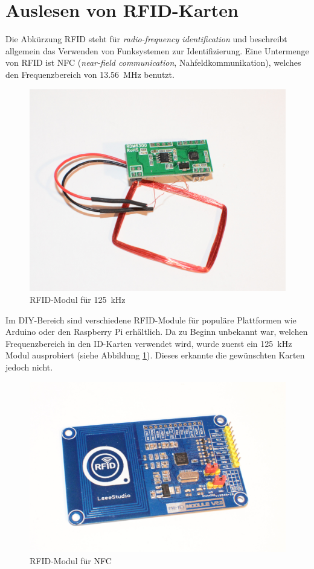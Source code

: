 \documentclass[11pt,a4paper]{IEEEtran}
\begin{document}
\section{Auslesen von RFID-Karten} \label{sec:rfid}

Die Abkürzung RFID steht für \emph{radio-frequency identification} und
beschreibt allgemein das Verwenden von Funksystemen zur Identifizierung. Eine
Untermenge von RFID ist NFC (\emph{near-field communication},
Nahfeldkommunikation), welches den Frequenzbereich von \SI{13,56}{\mega\hertz}
benutzt.

\begin{figure}[ht]
    \label{fig:rfid125khz}
    \centering
    \includegraphics[width=.8\columnwidth]{images/125khz_rfid}
    \caption{RFID-Modul für \SI{125}{\kilo\hertz}}
\end{figure}

Im DIY-Bereich sind verschiedene RFID-Module für populäre Plattformen wie
Arduino oder den Raspberry Pi erhältlich. Da zu Beginn unbekannt war, welchen
Frequenzbereich in den ID-Karten verwendet wird, wurde zuerst ein 
\SI{125}{\kilo\hertz} Modul ausprobiert (siehe Abbildung \ref{fig:rfid125khz}).
Dieses erkannte die gewünschten Karten jedoch nicht. 

\begin{figure}[ht]
    \label{fig:rfidnfc}
    \centering
    \includegraphics[width=.8\columnwidth]{images/nfc_reader}
    \caption{RFID-Modul für NFC}
\end{figure}
\end{document}
